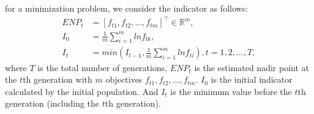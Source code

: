 \documentclass[conference]{IEEEtran}
\begin{document}
for a minimization problem, we consider the indicator as follows:
\begin{equation}\begin{aligned}\label{ewcd1}
  ENP_{t} &= [f_{t1},f_{t2},\dots,f_{tm}]^\top \in \mathbb{R}^m ,\\
  I_{0} &= \frac{1}{m} \sum_{i=1}^{m}lnf_{0i},\\
  I_{t} &= min(I_{t-1},\frac{1}{m} \sum_{i=1}^{m}lnf_{ti}),
  t = 1,2,\dots,T,
\end{aligned}
\end{equation}
where $T$ is the total number of generations, 
$ENP_{t}$ is the estimated nadir point at the $t$th generation with $m$ objectives $f_{t1},f_{t2},\dots,f_{tm}$. 
$I_0$ is the initial indicator calculated by the initial population.
And $I_t$ is the minimum value before the $t$th generation (including the $t$th generation). 
\end{document}
